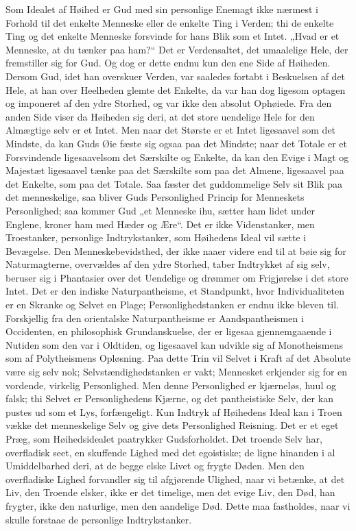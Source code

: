 \documentclass[12pt]{book}
\begin{document}
Som Idealet af Høihed er Gud med sin personlige Enemagt ikke nærmest
i Forhold til det enkelte Menneske eller de enkelte Ting i Verden;
thi de enkelte Ting og det enkelte Menneske forsvinde for hans Blik
som et Intet. „Hvad er et Menneske, at du tænker paa ham?“ Det er
Verdensaltet, det umaalelige Hele, der fremstiller sig for Gud. Og
dog er dette endnu kun den ene Side af Høiheden. Dersom Gud, idet
han overskuer Verden, var saaledes fortabt i Beskuelsen af det Hele,
at han over Heelheden glemte det Enkelte, da var han dog ligesom
optagen og imponeret af den ydre Storhed, og var ikke den absolut
Ophøiede. Fra den anden Side viser da Høiheden sig deri, at det
store uendelige Hele for den Almægtige selv er et Intet. Men naar
det Største er et Intet ligesaavel som det Mindste, da kan Guds Øie
fæste sig ogsaa paa det Mindste; naar det Totale er et
Forsvindende ligesaavelsom det Særskilte og Enkelte, da kan den
Evige i Magt og Majestæt ligesaavel tænke paa det Særskilte som paa
det Almene, ligesaavel paa det Enkelte, som paa det Totale. Saa
fæster det guddommelige Selv sit Blik paa det menneskelige, saa
bliver Guds Personlighed Princip for Menneskets Personlighed; saa
kommer Gud „et Menneske ihu, sætter ham lidet under Englene, kroner
ham med Hæder og Ære“.
Det er ikke Videnstanker, men Troestanker, personlige
Indtrykstanker, som Høihedens Ideal vil sætte i Bevægelse. Den
Menneskebevidsthed, der ikke naaer videre end til at bøie sig for
Naturmagterne, overvældes af den ydre Storhed, taber Indtrykket af
sig selv, beruser sig i Phantasier over det Uendelige og drømmer om
Frigjørelse i det store Intet. Det er den indiske Naturpantheisme,
et Standpunkt, hvor Individualiteten er en Skranke og Selvet en
Plage; Personlighedstanken er endnu ikke bleven til. Forskjellig fra
den orientalske Naturpantheisme er Aandspantheismen i Occidenten, en
philosophisk Grundanskuelse, der er ligesaa gjennemgaaende i Nutiden
som den var i Oldtiden, og ligesaavel kan udvikle sig af
Monotheismens som af Polytheismens Opløsning. Paa dette Trin vil
Selvet i Kraft af det Absolute være sig selv nok;
Selvstændighedstanken er vakt; Mennesket erkjender sig for en
vordende, virkelig Personlighed. Men denne Personlighed er
kjærneløs, huul og falsk; thi Selvet er Personlighedens Kjærne, og
det pantheistiske Selv, der kan pustes ud som et Lys, forfængeligt.
Kun Indtryk af Høihedens Ideal kan i Troen vække det menneskelige
Selv og give dets Personlighed Reisning. Det er et eget Præg, som
Høihedsidealet paatrykker Gudsforholdet. Det troende Selv har,
overfladisk seet, en skuffende Lighed med det egoistiske; de ligne
hinanden i al Umiddelbarhed deri, at de begge elske Livet og frygte
Døden. Men den overfladiske Lighed forvandler sig til afgjørende
Ulighed, naar vi betænke, at det Liv, den Troende elsker, ikke er
det timelige, men det evige Liv, den Død, han frygter, ikke den
naturlige, men den aandelige Død. Dette maa fastholdes, naar vi
skulle forstaae de personlige Indtrykstanker.
\end{document}
